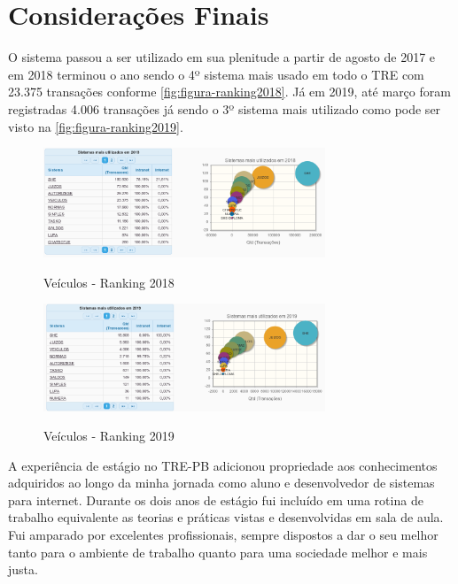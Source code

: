 
\chapter{Considerações Finais}
\label{chap:consideracoesFinais}


O sistema passou a ser utilizado em sua plenitude a partir de agosto de 2017 e em 2018 terminou o ano sendo o 4º sistema mais usado em todo o TRE com 23.375 transações conforme \autoref{fig:figura-ranking2018}. Já em 2019, até março foram registradas 4.006 transações já sendo o 3º sistema mais utilizado como pode ser visto na \autoref{fig:figura-ranking2019}.

\begin{figure}[!htb]
    \centering
    \caption{Veículos - Ranking 2018}
    \includegraphics[width=0.75\textwidth]{./dados/figuras/ranking2018.png}
    \label{fig:figura-ranking2018}
\end{figure}

\begin{figure}[!htb]
    \centering
    \caption{Veículos - Ranking 2019}
    \includegraphics[width=0.75\textwidth]{./dados/figuras/ranking2019.png}
    \label{fig:figura-ranking2019}
\end{figure}

A experiência de estágio no TRE-PB adicionou propriedade aos conhecimentos adquiridos ao longo da minha jornada como aluno e desenvolvedor de sistemas para internet. 
Durante os dois anos de estágio fui incluído em uma rotina de trabalho equivalente as teorias e práticas vistas e desenvolvidas em sala de aula. 
Fui amparado por excelentes profissionais, sempre dispostos a dar o seu melhor tanto para o ambiente de trabalho quanto para uma sociedade melhor e mais justa.


